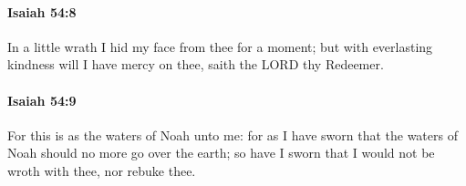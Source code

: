 		\paragraph{Isaiah 54:8} %
			\label{ISAIAH-54-8}

			In a little wrath I hid my face from thee for a moment; but with everlasting kindness will I have mercy on thee, saith the LORD thy Redeemer.


		\paragraph{Isaiah 54:9} %
			\label{ISAIAH-54-9}

			For this is as the waters of Noah unto me: for as I have sworn that the waters of Noah should no more go over the earth; so have I sworn that I would not be wroth with thee, nor rebuke thee.


